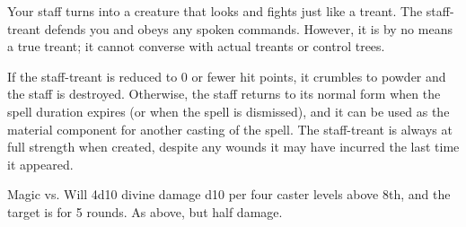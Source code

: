 \begin{spellheader}
    \spelldur{\durmed \dismissable}
\end{spellheader}
\begin{spelleffects}
    \spelleffect Your staff turns into a creature that looks and fights just like a treant. The staff-treant defends you and obeys any spoken commands. However, it is by no means a true treant; it cannot converse with actual treants or control trees.

    If the staff-treant is reduced to 0 or fewer hit points, it crumbles to powder and the staff is destroyed. Otherwise, the staff returns to its normal form when the spell duration expires (or when the spell is dismissed), and it can be used as the material component for another casting of the spell. The staff-treant is always at full strength when created, despite any wounds it may have incurred the last time it appeared.
\end{spelleffects}
\begin{spellfooter}
\end{spellfooter}

\begin{spellheader}
    \spellrng{\rngmed}
\end{spellheader}
\begin{spelleffects}
    \begin{spellattack}{Magic vs. Will}
        \spellsuccess 4d10 divine damage \add d10 per four caster levels above 8th, and the target is \bewildered for 5 rounds.
        \spellfailure As above, but half damage.
    \end{spellattack}
\end{spelleffects}
\begin{spellfooter}

\end{spellfooter}

